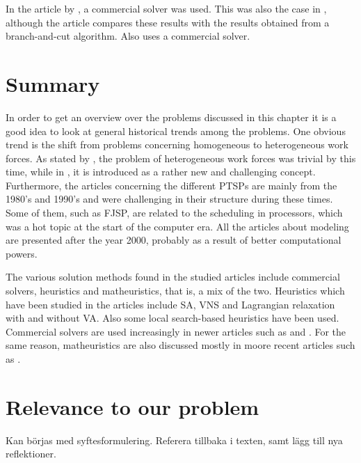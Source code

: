 In the article by \citet{eiselt_2008}, a commercial solver was used. This was also the case in \citet{mohan_2008}, although the article compares these results with the results obtained from a branch-and-cut algorithm. Also \cite{shahnazari_2013} uses a commercial solver.

\section{Summary}

In order to get an overview over the problems discussed in this chapter it is a good idea to look at general historical trends among the problems. One obvious trend is the shift from problems concerning homogeneous to heterogeneous work forces. As stated by \citet{krishnamoorthy_2012}, the problem of heterogeneous work forces was trivial by this time, while in \citet{loucks_1991}, it is introduced as a rather new and challenging concept. Furthermore, the articles concerning the different PTSPs are mainly from the 1980's and 1990's and were challenging in their structure during these times. Some of them, such as FJSP, are related to the scheduling in processors, which was a hot topic at the start of the computer era. All the articles about modeling are presented after the year 2000, probably as a result of better computational powers.

The various solution methods found in the studied articles include commercial solvers, heuristics and matheuristics, that is, a mix of the two. Heuristics which have been studied in the articles include SA, VNS and Lagrangian relaxation with and without VA. Also some local search-based heuristics have been used. Commercial solvers are used increasingly in newer articles such as \citet{hojati_2011} and \citet{mohan_2008}. For the same reason, matheuristics are also discussed mostly in moore recent articles such as \citet{akbari_2013}.

\section{Relevance to our problem}



Kan börjas med syftesformulering. 
Referera tillbaka i texten, samt lägg till nya reflektioner.









\iffalse


